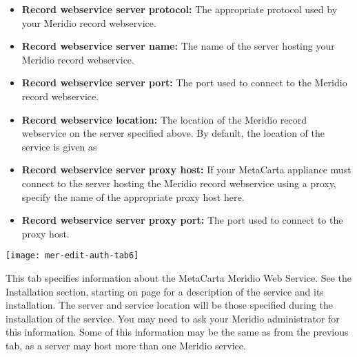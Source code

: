 \begin{itemize}

\item \textbf{Record webservice server protocol:} The appropriate protocol used by your Meridio record webservice.

\item \textbf{Record webservice server name:}  The name of the server hosting your Meridio record webservice.

\item \textbf{Record webservice server port:} The port used to connect to the Meridio record webservice.

\item \textbf{Record webservice location:} The location of the Meridio record webservice on the server specified above. By default, the location of the service is given as 

\item \textbf{Record webservice server proxy host:} If your MetaCarta appliance must connect to the server hosting the Meridio record webservice using a proxy, specify the name of the appropriate proxy host here.

\item \textbf{Record webservice server proxy port:} The port used to connect to the proxy host.

\end{itemize}


\texttt{[image: mer-edit-auth-tab6]}


This tab specifies information about the MetaCarta Meridio Web
Service. See the Installation section, starting on page
\pageref{SWService} for a description of the service and its installation.
The server and service location will be those specified during the
installation of the service. You may need to ask your Meridio
administrator for this information.  Some of this information may be
the same as from the previous tab, as a server may host more than one
Meridio service.


